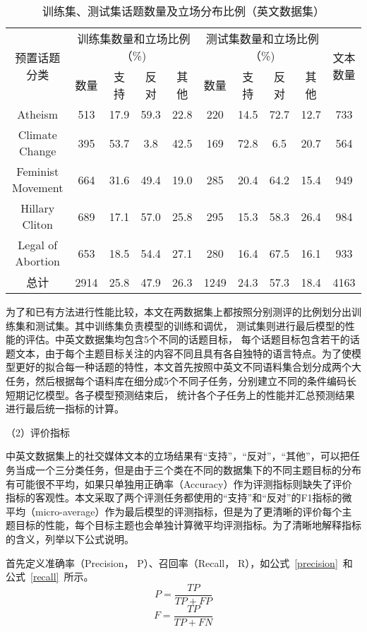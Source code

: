\begin{table}[htbp]
	\caption[table123]{训练集、测试集话题数量及立场分布比例（英文数据集）}
	\label{englishdata}
	\vspace{0.5em}\centering\wuhao
	\begin{tabular}{cccccccccc}
		\toprule[1.5pt]
		\multirow{2}{*}{预置话题分类}& \multicolumn{4}{c}{训练集数量和立场比例（\%)} 
		& \multicolumn{4}{c}{测试集数量和立场比例（\%)}  &\multirow{2}{*}{文本数量}\\
		\cline{2-9}
		\quad&数量& 支持&反对&其他&数量& 支持&反对&其他 \\
		\midrule[1pt]
		Atheism&513&17.9&59.3&22.8&220&14.5&72.7&12.7&733\\
		Climate Change&395&53.7&3.8&42.5&169&72.8&6.5&20.7&564\\
		Feminist Movement&664&31.6&49.4&19.0&285&20.4&64.2&15.4&949\\
		Hillary Cliton&689&17.1&57.0&25.8&295&15.3&58.3&26.4&984\\
		Legal of Abortion&653&18.5&54.4&27.1&280&16.4&67.5&16.1&933\\
		总计&2914&25.8&47.9&26.3&1249&24.3&57.3&18.4&4163\\
		\bottomrule[1.5pt]
	\end{tabular}
\end{table}

为了和已有方法进行性能比较，本文在两数据集上都按照分别测评的比例划分出训练集和测试集。其中训练集负责模型的训练和调优， 测试集则进行最后模型的性能的评估。中英文数据集均包含5个不同的话题目标， 每个话题目标包含若干的话题文本，由于每个主题目标关注的内容不同且具有各自独特的语言特点。为了使模型更好的拟合每一种话题的特性，本文首先按照中英文不同语料集合划分成两个大任务，然后根据每个语料库在细分成5个不同子任务，分别建立不同的条件编码长短期记忆模型。各子模型预测结束后， 统计各个子任务上的性能并汇总预测结果进行最后统一指标的计算。

（2）评价指标

中英文数据集上的社交媒体文本的立场结果有“支持”，“反对”，“其他”，可以把任务当成一个三分类任务，但是由于三个类在不同的数据集下的不同主题目标的分布有可能很不平均，如果只单独用正确率（Accuracy）作为评测指标则缺失了评价指标的客观性。本文采取了两个评测任务都使用的“支持”和“反对”的F1指标的微平均（micro-average）作为最后模型的评测指标，但是为了更清晰的评价每个主题目标的性能，每个目标主题也会单独计算微平均评测指标。为了清晰地解释指标的含义，列举以下公式说明。

首先定义准确率（Precision， P）、召回率（Recall， R），如公式~\ref{precision}~和公式~\ref{recall}~所示。
\begin{equation}\label{precision}P=\frac{TP}{TP+FP}\end{equation}
\begin{equation}\label{recall}F=\frac{TP}{TP+FN}\end{equation}


